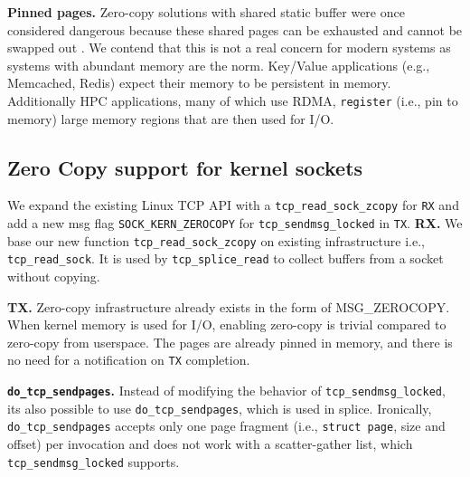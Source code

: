 \noindent\textbf{Pinned pages.} Zero-copy solutions with shared static buffer were once considered dangerous because these shared pages can be exhausted and cannot be swapped out \cite{song2012performance,yamagiwa2005active}. We contend that this is not a real concern for modern systems as systems with abundant memory are the norm. Key/Value applications (e.g., Memcached, Redis) expect their memory to be persistent in memory. Additionally HPC applications, many\cite{top500} of which use RDMA, \texttt{register} (i.e., pin to memory) large memory regions that are then used for I/O.

\subsection{Zero Copy support for kernel sockets}
We expand the existing Linux TCP API with a \texttt{tcp\_read\_sock\_zcopy} for \texttt{RX} and add a new msg flag \texttt{SOCK\_KERN\_ZEROCOPY} for \texttt{tcp\_sendmsg\_locked} in \texttt{TX}. 
\noindent \textbf{RX.} We base our new function \texttt{tcp\_read\_sock\_zcopy} on existing infrastructure i.e., \texttt{tcp\_read\_sock}. It is used by \texttt{tcp\_splice\_read} to collect buffers from a socket without copying.

\noindent \textbf{TX.} Zero-copy infrastructure already exists in the form of MSG\_ZEROCOPY\cite{desendmsg}. When kernel memory is used for I/O, enabling zero-copy is trivial compared to zero-copy from userspace. The pages are already pinned in memory, and there is no need for a notification on \texttt{TX} completion. %


\noindent \textbf{\texttt{do\_tcp\_sendpages}.}
Instead of modifying the behavior of \texttt{tcp\_sendmsg\_locked}, its also possible to use \texttt{do\_tcp\_sendpages}, which is used in splice. Ironically, \texttt{do\_tcp\_sendpages} accepts only one page fragment (i.e., \texttt{struct page}, size and offset) per invocation and does not work with a scatter-gather list, which \texttt{tcp\_sendmsg\_locked} supports.

